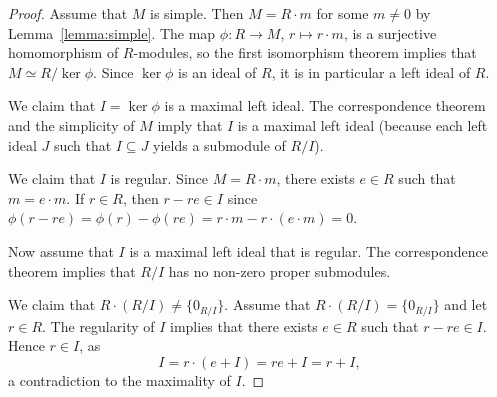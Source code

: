 \begin{proof}
	Assume that $M$ is simple. Then $M=R\cdot m$ for some $m\ne0$ by 
	Lemma~\ref{lemma:simple}. The map $\phi\colon R\to M$, $r\mapsto r\cdot m$, 
	is a surjective homomorphism of $R$-modules, 
	so the first isomorphism theorem implies that 
	$M\simeq R/\ker\phi$. Since $\ker\phi$ is an ideal of $R$, it is 
	in particular a left ideal of $R$. 
	
	We claim that $I=\ker\phi$ is a maximal left ideal. 
	The correspondence theorem 
	and the simplicity of $M$ imply that $I$ is a 
	maximal left ideal (because each left ideal $J$ such that 
	$I\subseteq J$ yields a submodule of $R/I$).

	We claim that $I$ is regular. Since $M=R\cdot m$, there exists $e\in R$ such that $m=e\cdot m$. If
	$r\in R$, then $r-re\in I$ since 
	$\phi(r-re)=\phi(r)-\phi(re)=r\cdot m-r\cdot (e\cdot m)=0$.

    Now assume that $I$ is a maximal left ideal that is regular. 
    The correspondence theorem implies that 
    $R/I$ has no non-zero proper submodules. 
    
    We claim that 
    $R\cdot (R/I)\ne\{0_{R/I}\}$. Assume that $R\cdot (R/I)=\{0_{R/I}\}$ and let $r\in R$. 
    The regularity of $I$ implies that 
    there exists $e\in R$ such that $r-re\in I$. Hence $r\in I$, as  
	\[
	I=r\cdot (e+I)=re+I=r+I,
	\]
	a contradiction to the maximality of $I$. 
\end{proof}


